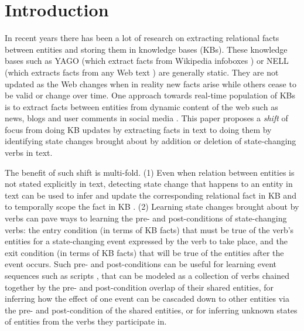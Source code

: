 \section{Introduction}

In recent years there has been a lot of research on extracting relational facts between entities and storing them in knowledge bases (KBs). These knowledge bases such as YAGO (which extract facts from Wikipedia infoboxes \cite{suchanek2007yago}) or NELL (which extracts facts from any Web text \cite{carlson2010toward,fader2011identifying}) are generally static. They are not updated as the Web changes when in reality new facts arise while others cease to be valid or change over time. One approach towards real-time population of KBs is to extract facts between entities from dynamic content of the web such as news, blogs and user comments in social media \cite{nakashole2012real}. This paper proposes a \textit{shift} of focus from doing KB updates by extracting facts in text to doing them by identifying state changes brought about by addition or deletion of state-changing verbs in text. 

The benefit of such shift is multi-fold. (1) Even when relation between entities is not stated explicitly in text, detecting state change that happens to an entity in text can be used to infer and update the corresponding relational fact in KB and to temporally scope the fact in KB \cite{wijayactp}. (2) Learning state changes brought about by verbs can pave ways to learning the pre- and post-conditions of state-changing verbs: the entry condition (in terms of KB facts) that must be true of the verb's entities for a state-changing event expressed by the verb to take place, and the exit condition (in terms of KB facts) that will be true of the entities after the event occurs. Such pre- and post-conditions can be useful for learning event sequences such as scripts \cite{schank2013scripts}, that can be modeled as a collection of verbs chained together by the pre- and post-condition overlap of their shared entities, for inferring how the effect of one event can be cascaded down to other entities via the pre- and post-condition of the shared entities, or for inferring unknown states of entities from the verbs they participate in.  

